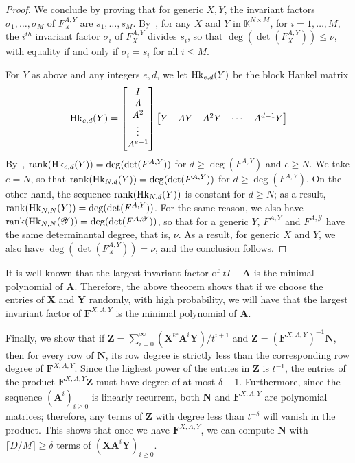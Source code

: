 \documentclass[12pt]{article}
\def\K {\ensuremath{\mathbb{K}}}
\def\K{\mathbb{K}}
\def\scrY{\mathscr{Y}}
\def\mA{\mathbf{A}}
\def\mF{\mathbf{F}}
\def\mN{\mathbf{N}}
\def\mX{\mathbf{X}}
\def\mY{\mathbf{Y}}
\def\mZ{\mathbf{Z}}
\begin{document}
\begin{proof}
	We conclude by proving that for generic $X,Y$, the invariant factors
	$\sigma_1,\dots,\sigma_M$ of $F_X^{A,Y}$ are $s_1,\dots,s_M$.
	By~\cite[Theorem~2.12]{KaVi04}, for any $X$ and $Y$ in $\K^{N\times
		M}$, for $i=1,\dots,M$, the $i^{th}$ invariant factor $\sigma_i$ of
	$F_X^{A,Y}$ divides $s_i$, so that $\deg(\det(F_X^{A,Y}))\le\nu$, with
	equality if and only if $\sigma_i=s_i$ for all $i \le M$.
	
	For $Y$ as above and any integers $e,d$, we let ${\rm Hk}_{e,d}(Y)$ be
	the block Hankel matrix
	$$ {\rm Hk}_{e,d}(Y) =
	\begin{bmatrix}
	I \\  A \\  A^2 \\ \vdots  \\  A^{e-1}
	\end{bmatrix}
	\begin{bmatrix}
	Y & AY & A^2Y &\cdots&  A^{d-1}Y
	\end{bmatrix}
	$$ By~\cite[Eq.~(2.6)]{KaVi04}, ${\rm rank}({\rm Hk}_{e,d}(Y)) =
	\deg(\det(F^{A,Y}))$ for $d \ge \deg(F^{A,Y})$ and $e \ge N$.  We take
	$e=N$, so that ${\rm rank}({\rm Hk}_{N,d}(Y)) = \deg(\det(F^{A,Y}))$
	for $d \ge \deg(F^{A,Y})$. On the other hand, the sequence ${\rm
		rank}({\rm Hk}_{N,d}(Y))$ is constant for $d \ge N$; as a result,
	${\rm rank}({\rm Hk}_{N,N}(Y)) = \deg(\det(F^{A,Y}))$. For the same
	reason, we also have ${\rm rank}({\rm Hk}_{N,N}(\scrY)) =
	\deg(\det(F^{A,\scrY}))$, so that for a generic $Y$, $F^{A,Y}$ and
	$F^{A,\scrY}$ have the same determinantal degree, that is, $\nu$.  As
	a result, for generic $X$ and $Y$, we also have
	$\deg(\det(F_X^{A,Y}))=\nu$, and the conclusion follows.
\end{proof}

It is well known that the largest invariant factor of
$tI - \mA$ is the minimal polynomial of $\mA$. Therefore, the above
theorem shows that if we choose the entries of $\mX$ and $\mY$
randomly, with high probability, we will have that the
largest invariant factor of $\mF^{X,A,Y}$ is the minimal
polynomial of $\mA$.

Finally, we show that if $\mZ = 
\sum_{i=0}^{\infty} (\mX^{tr} \mA^i \mY)/ t^{i+1}$ and
$\mZ = (\mF^{X,A,Y})^{-1}\mN$,
then for every row of $\mN$, its row degree is strictly
less than the corresponding row degree of $\mF^{X,A,Y}$.
Since the highest power of the entries in $\mZ$ is $t^{-1}$, the 
entries of the product $\mF^{X,A,Y}\mZ$ must have degree of at 
most $\delta -1$. Furthermore, since the sequence $(\mA^i)_{i \ge 
0}$ is linearly recurrent, both $\mN$ and $\mF^{X,A,Y}$ are 
polynomial matrices;
therefore, any terms of $\mZ$ with degree less than $t^{-\delta}$
will vanish in the product.
This shows that once we have $\mF^{X,A,Y}$, we can compute
$\mN$ with $\lceil D / M \rceil \ge \delta$ terms of $(\mX\mA^i\mY)_{i \ge 0}$.
\end{document}
